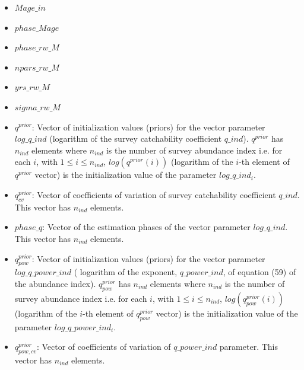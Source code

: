 \documentclass{article}
\begin{document}
\begin{itemize}
    \item $Mage\_in$
    \item $phase\_Mage$
    \item $phase\_rw\_M$
    \item $npars\_rw\_M$
    \item $yrs\_rw\_M$
    \item $sigma\_rw\_M$
    \item $q^{prior}$: Vector of initialization values (priors) for the vector parameter $log\_q\_ind$ (logarithm of the survey catchability coefficient $q\_ind$). $q^{prior}$ has $n_{ind}$ elements where $n_{ind}$ is the number of survey abundance index i.e. for each $i$, with $1\leq i \leq n_{ind}$, $log(q^{prior}(i))$ (logarithm of the $i$-th element of $q^{prior}$ vector) is the initialization value of the parameter $log\_q\_ind_i$.
    \item $q^{prior}_{cv}$: Vector of coefficients of variation of survey catchability coefficient $q\_ind$. This vector  has $n_{ind}$ elements.
    \item $phase\_q$: Vector of the estimation phases of the vector parameter $log\_q\_ind$. This vector has $n_{ind}$ elements.
    \item $q^{prior}_{pow}$: Vector of initialization values (priors) for the vector parameter $log\_q\_power\_ind$ ( logarithm of the exponent, $q\_power\_ind$, of equation (59) of the abundance index). $q^{prior}_{pow}$ has $n_{ind}$ elements where $n_{ind}$ is the number of survey abundance index i.e. for each $i$, with $1\leq i \leq n_{ind}$, $log(q^{prior}_{pow}(i))$ (logarithm of the $i$-th element of $q^{prior}_{pow}$ vector) is the initialization value of the parameter $log\_q\_power\_ind_i$.
    \item $q^{prior}_{pow,cv}$: Vector of coefficients of variation of $q\_power\_ind$ parameter. This vector  has $n_{ind}$ elements.

\end{itemize}
\end{document}
